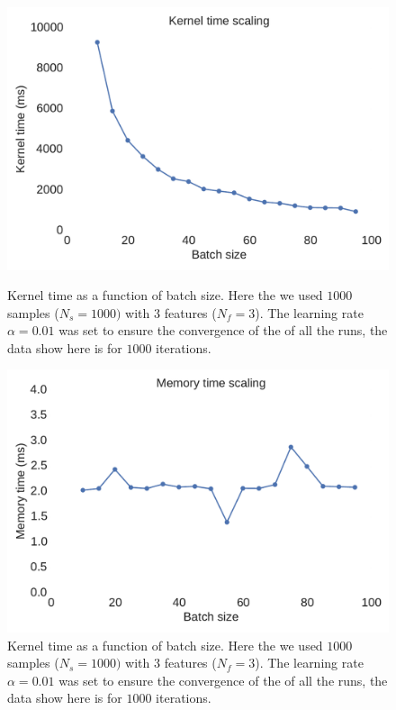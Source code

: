 \documentclass[11pt,a4paper]{article}
\begin{document}
\begin{figure}[H]
	\centering
  \includegraphics[width=\linewidth]{kernel_time_batch_scaling.pdf}
  \caption{Kernel time as a function of batch size. Here the we used $1000$ samples ($N_s=1000) $ with $3$ features ($N_f=3$). The learning rate $\alpha=0.01$ was set to ensure the convergence of the of all the runs, the data show here is for $1000$ iterations.}
  \label{fig:test_batch_size_kernel}
\endminipage
\hfill
{}
  \includegraphics[width=\linewidth]{memory_time_batch_scaling.pdf}
  \caption{Kernel time as a function of batch size. Here the we used $1000$ samples ($N_s=1000) $ with $3$ features ($N_f=3$). The learning rate $\alpha=0.01$ was set to ensure the convergence of the of all the runs, the data show here is for $1000$ iterations.}
  \label{fig:test_batch_size_memory}
\endminipage
\end{figure}
\end{document}
